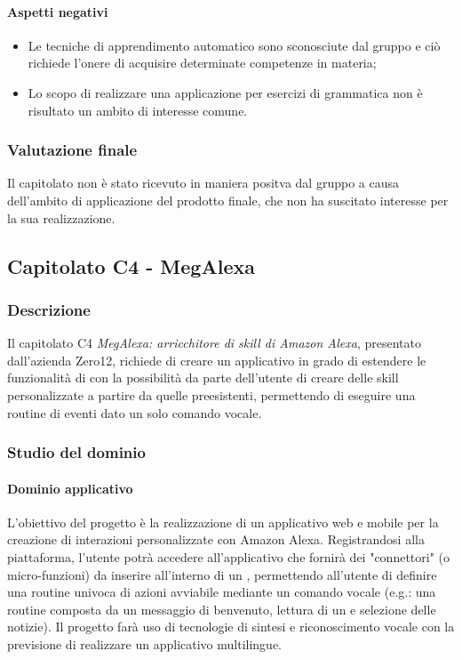 	\paragraph{Aspetti negativi} 
	\begin{itemize}
		\item {Le tecniche di apprendimento automatico sono sconosciute dal gruppo e ciò richiede l'onere di acquisire determinate competenze in materia;}
		\item {Lo scopo di realizzare una applicazione per esercizi di grammatica non è risultato un ambito di interesse comune.}
	\end{itemize} 
	\subsubsection{Valutazione finale}
	Il capitolato non è stato ricevuto in maniera positva dal gruppo a causa dell'ambito di applicazione del prodotto finale, che non ha suscitato interesse per la sua realizzazione.
	
\subsection{Capitolato C4 - MegAlexa}
\subsubsection{Descrizione}    
Il capitolato C4 \emph{MegAlexa: arricchitore di skill di Amazon Alexa}, presentato dall'azienda Zero12, richiede di creare un applicativo in grado di estendere le funzionalità di  con la possibilità da parte dell'utente di creare delle skill personalizzate a partire da quelle preesistenti, permettendo di eseguire una routine di eventi dato un solo comando vocale.
\subsubsection{Studio del dominio}

\paragraph{Dominio applicativo} \Spazio
L'obiettivo del progetto è la realizzazione di un applicativo web e mobile per la creazione di interazioni personalizzate con Amazon Alexa. Registrandosi alla piattaforma, l'utente potrà accedere all'applicativo che fornirà dei "connettori" (o micro-funzioni) da inserire all'interno di un , permettendo all'utente di definire una routine univoca di azioni avviabile mediante un comando vocale (e.g.: una routine composta da un messaggio di benvenuto, lettura di un  e selezione delle notizie). Il progetto farà uso di tecnologie di sintesi e riconoscimento vocale con la previsione di realizzare un applicativo multilingue.
